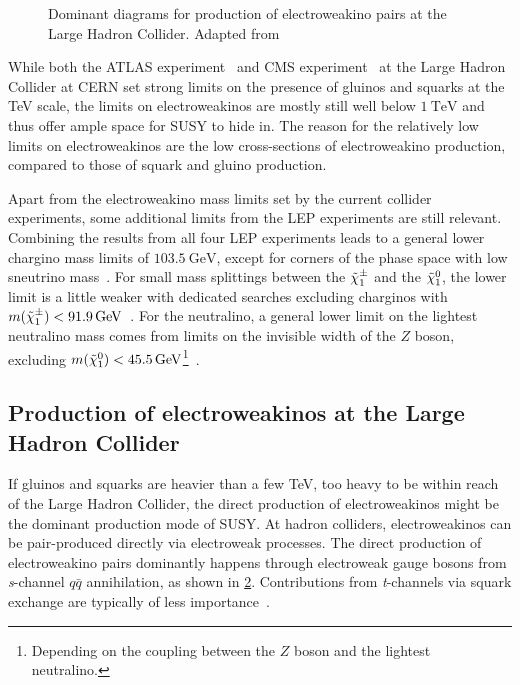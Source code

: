 \begin{figure}
\begin{subfigure}[b]{0.33\linewidth}
		\caption{\label{fig:electroweakino_production_3}}
	\end{subfigure}	
	\caption{Dominant diagrams for production of electroweakino pairs at the Large Hadron Collider. Adapted from \cite{Martin:1997ns}}\label{fig:electroweakino_production}
\end{figure}

While both the ATLAS experiment~\cite{ATLASsummary} and CMS experiment~\cite{CMSsummary} at the Large Hadron Collider at CERN set strong limits on the presence of gluinos and squarks at the TeV scale, the limits on electroweakinos are mostly still well below $\SI{1}{\TeV}$ and thus offer ample space for SUSY to hide in. The reason for the relatively low limits on electroweakinos are the low cross-sections of electroweakino production, compared to those of squark and gluino production. 

Apart from the electroweakino mass limits set by the current collider experiments, some additional limits from the LEP experiments are still relevant. Combining the results from all four LEP experiments leads to a general lower chargino mass limits of $\SI{103.5}{\GeV}$, except for corners of the phase space with low sneutrino mass~\cite{lep_susy_results}. For small mass splittings between the $\tilde{\chi}_1^\pm$ and the $\tilde{\chi}_1^0$, the lower limit is a little weaker with dedicated searches excluding charginos with $m(\charg) < \SI{91.9}{\GeV}$~\cite{lep_susy_results}. For the neutralino, a general lower limit on the lightest neutralino mass comes from limits on the invisible width of the $Z$ boson, excluding $m(\lsp) < \SI{45.5}{\GeV}$\footnote{Depending on the coupling between the $Z$ boson and the lightest neutralino.}~\cite{pdg2020}.

\subsection{Production of electroweakinos at the Large Hadron Collider}

If gluinos and squarks are heavier than a few TeV, \ie too heavy to be within reach of the Large Hadron Collider, the direct production of electroweakinos might be the dominant production mode of SUSY. At hadron colliders, electroweakinos can be pair-produced directly via electroweak processes. The direct production of electroweakino pairs dominantly happens through electroweak gauge bosons from \textit{s}-channel $q\bar{q}$ annihilation, as shown in \cref{fig:electroweakino_production}. Contributions from \textit{t}-channels via squark exchange are typically of less importance~\cite{Martin:1997ns}.


